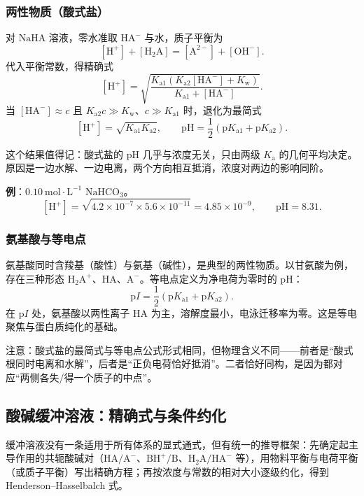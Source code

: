 \documentclass[UTF8]{ctexbook}
\begin{document}
\subsubsection{两性物质（酸式盐）}

对 $\mathrm{NaHA}$ 溶液，零水准取 $\mathrm{HA^-}$ 与水，质子平衡为
\[
[\mathrm{H^+}]+[\mathrm{H_2A}]=[\mathrm{A^{2-}}]+[\mathrm{OH^-}].
\]
代入平衡常数，得精确式
\[
[\mathrm{H^+}]=\sqrt{\frac{K_{\mathrm{a1}}\left(K_{\mathrm{a2}}[\mathrm{HA^-}]+K_{\mathrm{w}}\right)}{K_{\mathrm{a1}}+[\mathrm{HA^-}]}}.
\]
当 $[\mathrm{HA^-}]\approx c$ 且 $K_{\mathrm{a2}}c\gg K_{\mathrm{w}}$、$c\gg K_{\mathrm{a1}}$ 时，退化为最简式
\[
[\mathrm{H^+}]=\sqrt{K_{\mathrm{a1}}K_{\mathrm{a2}}},
\qquad
\mathrm{pH}=\frac{1}{2}\left(\mathrm{p}K_{\mathrm{a1}}+\mathrm{p}K_{\mathrm{a2}}\right).
\]

这个结果值得记：酸式盐的 $\mathrm{pH}$ 几乎与浓度无关，只由两级 $K_{\mathrm{a}}$ 的几何平均决定。原因是一边水解、一边电离，两个方向相互抵消，浓度对两边的影响同阶。

\textbf{例}：$0.10\ \mathrm{mol\cdot L^{-1}}$ $\mathrm{NaHCO_3}$。
\[
[\mathrm{H^+}]=\sqrt{4.2\times10^{-7}\times5.6\times10^{-11}}=4.85\times10^{-9},
\qquad
\mathrm{pH}=8.31.
\]

\subsubsection{氨基酸与等电点}

氨基酸同时含羧基（酸性）与氨基（碱性），是典型的两性物质。以甘氨酸为例，存在三种形态 $\mathrm{H_2A^+}$、$\mathrm{HA}$、$\mathrm{A^-}$。等电点定义为净电荷为零时的 $\mathrm{pH}$：
\[
\mathrm{p}I=\frac{1}{2}\left(\mathrm{p}K_{\mathrm{a1}}+\mathrm{p}K_{\mathrm{a2}}\right).
\]
在 $\mathrm{p}I$ 处，氨基酸以两性离子 $\mathrm{HA}$ 为主，溶解度最小，电泳迁移率为零。这是等电聚焦与蛋白质纯化的基础。

注意：酸式盐的最简式与等电点公式形式相同，但物理含义不同——前者是“酸式根同时电离和水解”，后者是“正负电荷恰好抵消”。二者恰好同构，是因为都对应“两侧各失/得一个质子的中点”。

\subsection{酸碱缓冲溶液：精确式与条件约化}

\label{sec:buffer-ph}

缓冲溶液没有一条适用于所有体系的显式通式，但有统一的推导框架：先确定起主导作用的共轭酸碱对（\(\mathrm{HA/A^-}\)、\(\mathrm{BH^+/B}\)、\(\mathrm{H_2A/HA^-}\) 等），用物料平衡与电荷平衡（或质子平衡）写出精确方程；再按浓度与常数的相对大小逐级约化，得到 Henderson--Hasselbalch 式。
\end{document}
